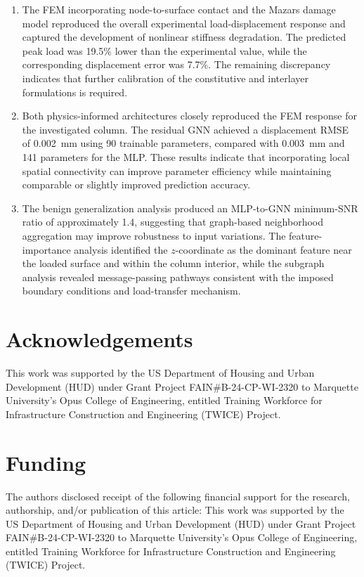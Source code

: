 \documentclass[review, authoryear, 12pt]{elsarticle}
\begin{document}
\begin{enumerate}
    \item The FEM incorporating node-to-surface contact and the Mazars damage model reproduced the overall experimental load-displacement response and captured the development of nonlinear stiffness degradation. The predicted peak load was 19.5\% lower than the experimental value, while the corresponding displacement error was 7.7\%. The remaining discrepancy indicates that further calibration of the constitutive and interlayer formulations is required.

    \item Both physics-informed architectures closely reproduced the FEM response for the investigated column. The residual GNN achieved a displacement RMSE of 0.002~mm using 90 trainable parameters, compared with 0.003~mm and 141 parameters for the MLP. These results indicate that incorporating local spatial connectivity can improve parameter efficiency while maintaining comparable or slightly improved prediction accuracy.

    \item The benign generalization analysis produced an MLP-to-GNN minimum-SNR ratio of approximately 1.4, suggesting that graph-based neighborhood aggregation may improve robustness to input variations. The feature-importance analysis identified the $z$-coordinate as the dominant feature near the loaded surface and within the column interior, while the subgraph analysis revealed message-passing pathways consistent with the imposed boundary conditions and load-transfer mechanism.
\end{enumerate}

\section*{Acknowledgements}

This work was supported by the US Department of Housing and Urban Development (HUD) under Grant Project FAIN\#B-24-CP-WI-2320 to Marquette University's Opus College of Engineering, entitled Training Workforce for Infrastructure Construction and Engineering (TWICE) Project.

\section*{Funding}
The authors disclosed receipt of the following financial support for the research, authorship, and/or publication of this article: This work was supported by the US Department of Housing and Urban Development (HUD) under Grant Project FAIN\#B-24-CP-WI-2320 to Marquette University's Opus College of Engineering, entitled Training Workforce for Infrastructure Construction and Engineering (TWICE) Project.
\end{document}
